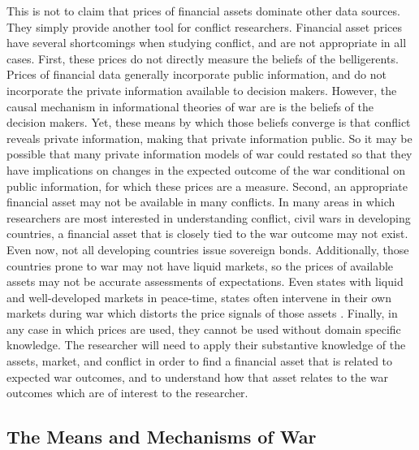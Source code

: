 This is not to claim that prices of financial assets dominate other data sources.
They simply provide another tool for conflict researchers.
Financial asset prices have several shortcomings when studying conflict, and are not appropriate in all cases.
First, these prices do not directly measure the beliefs of the belligerents.
Prices of financial data generally incorporate public information, and do not incorporate the private information available to decision makers.
However, the causal mechanism in informational theories of war are is the beliefs of the decision makers.
Yet, these means by which those beliefs converge is that conflict reveals private information, making that private information public.
So it may be possible that many private information models of war could restated so that they have implications on changes in the expected outcome of the war conditional on public information, for which these prices are a measure.
Second, an appropriate financial asset may not be available in many conflicts.
In many areas in which researchers are most interested in understanding conflict, \eg{} civil wars in developing countries, a financial asset  that is closely tied to the war outcome may not exist.
Even now, not all developing countries issue sovereign bonds.
Additionally, those countries prone to war may not have liquid markets, so the prices of available assets may not be accurate assessments of expectations.
Even states with liquid and well-developed markets in peace-time, states often intervene in their own markets during war which distorts the price signals of those assets \parencite[12]{HaberMitchenerOosterlinckEtAl2015}.
Finally, in any case in which prices are used, they cannot be used without domain specific knowledge.
The researcher will need to apply their substantive knowledge of the assets, market, and conflict in order to find a financial asset that is related to expected war outcomes, and to understand how that asset relates to the war outcomes which are of interest to the researcher.



\subsection{The Means and Mechanisms of War}
\label{sec:means-mechanisms-war}

